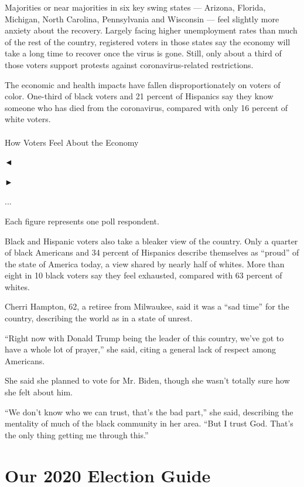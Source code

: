 Majorities or near majorities in six key swing states --- Arizona,
Florida, Michigan, North Carolina, Pennsylvania and Wisconsin --- feel
slightly more anxiety about the recovery. Largely facing higher
unemployment rates than much of the rest of the country, registered
voters in those states say the economy will take a long time to recover
once the virus is gone. Still, only about a third of those voters
support protests against coronavirus-related restrictions.

The economic and health impacts have fallen disproportionately on voters
of color. One-third of black voters and 21 percent of Hispanics say they
know someone who has died from the coronavirus, compared with only 16
percent of white voters.

\hypertarget{-2}{%
\paragraph{}\label{-2}}

How Voters Feel About the Economy

◄

►

...

Each figure represents one poll respondent.

Black and Hispanic voters also take a bleaker view of the country. Only
a quarter of black Americans and 34 percent of Hispanics describe
themselves as ``proud'' of the state of America today, a view shared by
nearly half of whites. More than eight in 10 black voters say they feel
exhausted, compared with 63 percent of whites.

Cherri Hampton, 62, a retiree from Milwaukee, said it was a ``sad time''
for the country, describing the world as in a state of unrest.

``Right now with Donald Trump being the leader of this country, we've
got to have a whole lot of prayer,'' she said, citing a general lack of
respect among Americans.

She said she planned to vote for Mr. Biden, though she wasn't totally
sure how she felt about him.

``We don't know who we can trust, that's the bad part,'' she said,
describing the mentality of much of the black community in her area.
``But I trust God. That's the only thing getting me through this.''

\hypertarget{our-2020-election-guide}{%
\section{Our 2020 Election Guide}\label{our-2020-election-guide}}

